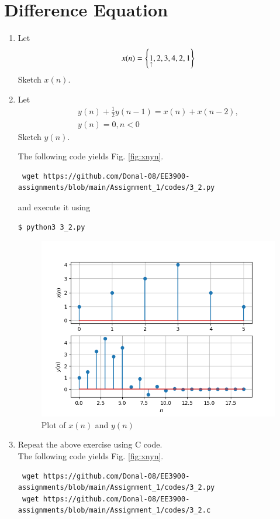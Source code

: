 \documentclass[journal,12pt,twocolumn]{IEEEtran}
\renewcommand\thesection{\arabic{section}}
\begin{document}
\section{Difference Equation}
\begin{enumerate}[label=\thesection.\arabic*,ref=\thesection.\theenumi]
\item Let
\begin{equation}
x(n) = \left\{\underset{\uparrow}{1},2,3,4,2,1\right\}
\end{equation}
Sketch $x(n)$.
\item Let
\begin{multline}
\label{eq:iir_filter}
y(n) + \frac{1}{2}y(n-1) = x(n) + x(n-2), 
\\
y(n) = 0, n < 0
\end{multline}
Sketch $y(n)$.

\solution The following code yields Fig. \eqref{fig:xnyn}.
\begin{lstlisting}
 wget https://github.com/Donal-08/EE3900-assignments/blob/main/Assignment_1/codes/3_2.py
\end{lstlisting}
and execute it using
\begin{lstlisting}
$ python3 3_2.py
\end{lstlisting}

\begin{figure}[!ht]
	\centering
	\includegraphics[width=\columnwidth]{figs/3_2.png}
	\caption{Plot of $x(n)$ and $y(n)$}
	\label{fig:xnyn}
\end{figure}
\item Repeat the above exercise using C code. \\
 \solution The following code yields Fig. \eqref{fig:xnyn}.
\begin{lstlisting}
 wget https://github.com/Donal-08/EE3900-assignments/blob/main/Assignment_1/codes/3_2.py
 wget https://github.com/Donal-08/EE3900-assignments/blob/main/Assignment_1/codes/3_2.c
\end{lstlisting}
\end{enumerate}
\end{document}
